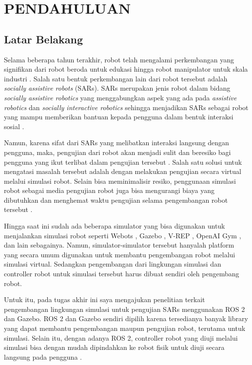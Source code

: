 \section{PENDAHULUAN}

\subsection{Latar Belakang}

Selama beberapa tahun terakhir, robot telah mengalami perkembangan yang signifikan dari robot beroda untuk edukasi \citep{Goncalves2009} hingga robot manipulator untuk skala industri \citep{Blatnicky2020}.
Salah satu bentuk perkembangan lain dari robot tersebut adalah \emph{socially assistive robots} (SARs).
SARs merupakan jenis robot dalam bidang \emph{socially assistive robotics} yang menggabungkan aspek yang ada pada \emph{assistive robotics} dan \emph{socially interactive robotics} sehingga menjadikan SARs sebagai robot yang mampu memberikan bantuan kepada pengguna dalam bentuk interaksi sosial \citep{Seifer2005}.

Namun, karena sifat dari SARs yang melibatkan interaksi langsung dengan pengguna, maka, pengujian dari robot akan menjadi sulit dan beresiko bagi pengguna yang ikut terlibat dalam pengujian tersebut \citep{Erickson2020}.
Salah satu solusi untuk mengatasi masalah tersebut adalah dengan melakukan pengujian secara virtual melalui simulasi robot.
Selain bisa meminimalisir resiko, penggunaan simulasi robot sebagai media pengujian robot juga bisa mengurangi biaya yang dibutuhkan dan menghemat waktu pengujian selama pengembangan robot tersebut \citep{Takaya2016}.

Hingga saat ini sudah ada beberapa simulator yang bisa digunakan untuk menjalankan simulasi robot seperti Webots \citep{Michel2004}, Gazebo \citep{Koenig2004}, V-REP \citep{Rohmer2013}, OpenAI Gym \citep{Brockman2016}, dan lain sebagainya.
Namun, simulator-simulator tersebut hanyalah platform yang secara umum digunakan untuk membantu pengembangan robot melalui simulasi virtual.
Sedangkan pengembangan dari lingkungan simulasi dan controller robot untuk simulasi tersebut harus dibuat sendiri oleh pengembang robot.

Untuk itu, pada tugas akhir ini saya mengajukan penelitian terkait pengembangan lingkungan simulasi untuk pengujian SARs menggunakan ROS 2 dan Gazebo.
ROS 2 dan Gazebo sendiri dipilih karena tersedianya banyak library yang dapat membantu pengembangan maupun pengujian robot, terutama untuk simulasi.
Selain itu, dengan adanya ROS 2, controller robot yang diuji melalui simulasi bisa dengan mudah dipindahkan ke robot fisik untuk diuji secara langsung pada pengguna \citep{Takaya2016}.

